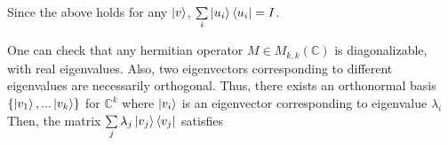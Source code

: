 {Since the above holds for any $\ket{v}$, $\sum\limits_i \ket{u_i}\bra{u_i}=I$.




\begin{comment}
Conventionally, for a ket $\ket{v}$, there is a corresponding dual vector \textit{"bra"} $\bra{v}$ such that
\begin{equation} \label{bra defn}
    \bra{v}(\ket{w}):=\braket{v|w}:=(\ket{v}, \ket{w})
\end{equation}
It turns out that the matrix representation of dual vectors is just a row vector as illustrated below:\\
Let $\{\ket{u_i}\}_{i=1}^{i=n}$ be some orthonormal basis of an inner product space V. Let $ \ket{v}=\sum_j v_j \ket{u_j}, \ket{w}=\sum_i w_i \ket{u_i}$. Since $(\ket{u_i},\ket{u_j})=\delta_{ij}$, using \eqref{inner product defn} and \eqref{bra defn}, we get
\begin{equation} \label{eqn: braket}
    \braket{v|w}=(\sum_j v_j \ket{u_j}, \sum_i w_i \ket{u_i})=\sum_i \sum_j v_i^* w_j \delta_{ij} = \sum_i v_i^* w_i = (v_1^*,\hdots, v_n^*)
    \icol{w_1\\ \vdots \\ w_n }
\end{equation}

As we can see, the bra vector $\bra{v}$ can be interpreted as the conjugate transpose of $\ket{v}$. 

In addition, a useful way of representing linear operators which makes use of the inner product is called the \textit{outer product} representation. Suppose $\ket{v} \in V, \ket{w} \in W$, where $V, W$ are both inner product space. Define $\ket{w}, \ket{v}$ to be the linear operator from V to W such that
\begin{equation}
    (\ket{w}\ket{v})(\ket{v'}):=\ket{w}\braket{v|v'}=\braket{v|v'}\ket{w}
\end{equation}

In other words, the bra-ket notation convention allows us to interpret $\ket{w}\braket{v|v'}$ in two ways: the operator $\ket{w}\bra{v}$ acting on $\ket{v'}$, or multiplying $\ket{w}$ by the complex number $\braket{v|v'}$.
\end{comment}
One can check that any hermitian operator $M \in M_{k,k}(\mathbb{C})$ is diagonalizable, with real eigenvalues.  Also, two eigenvectors corresponding to different eigenvalues are necessarily orthogonal.  Thus, there exists an orthonormal basis $\{\ket{v_1},...\ket{v_k}\}$ for $\mathbb{C}^k$ where $\ket{v_i}$ is an eigenvector corresponding to eigenvalue $\lambda_i$  Then, the matrix $\sum\limits_j \lambda_j \ket{v_j}\bra{v_j}$ satisfies

}

